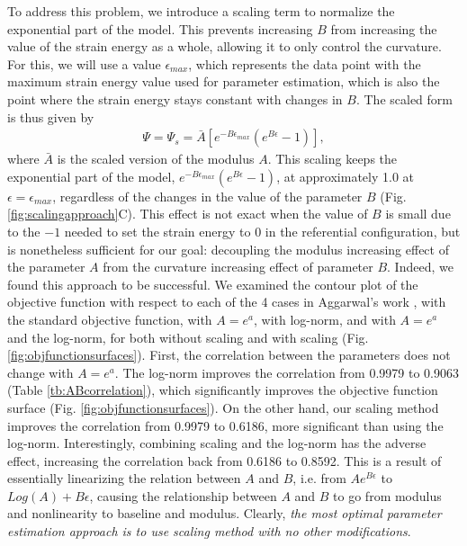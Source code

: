 	To address this problem, we introduce a scaling term to normalize the exponential part of the model. This prevents increasing $B$ from increasing the value of the strain energy as a whole, allowing it to only control the curvature. For this, we will use a value $\epsilon_{max}$, which represents the data point with the maximum strain energy value used for parameter estimation, which is also the point where the strain energy stays constant with changes in $B$. The scaled form is thus given by
\begin{equation}
\begin{aligned}
\Psi = \Psi_s = \bar{A} \left[e^{-B\epsilon_{max}} \left( e^{B\epsilon} - 1\right)\right],\label{eqn:scaledmodel1D}
\end{aligned}
\end{equation}
    where $\bar{A}$ is the scaled version of the modulus $A$. This scaling keeps the exponential part of the model, $e^{-B\epsilon_{max}} ( e^{B\epsilon} - 1)$, at approximately 1.0 at $\epsilon = \epsilon_{max}$, regardless of the changes in the value of the parameter $B$ (Fig. \ref{fig:scalingapproach}C). This effect is not exact when the value of $B$ is small due to the $-1$ needed to set the strain energy to 0 in the referential configuration, but is nonetheless sufficient for our goal: decoupling the modulus increasing effect of the parameter $A$ from the curvature increasing effect of parameter $B$. Indeed, we found this approach to be successful. We examined the contour plot of the objective function with respect to each of the 4 cases in Aggarwal's work \cite{aggarwal_improved_2017}, with the standard objective function, with $A=e^{a}$, with log-norm, and with $A=e^{a}$ and the log-norm, for both without scaling and with scaling (Fig. \ref{fig:objfunctionsurfaces}). First, the correlation between the parameters does not change with $A=e^{a}$. The log-norm improves the correlation from 0.9979 to 0.9063 (Table \ref{tb:ABcorrelation}), which significantly improves the objective function surface (Fig. \ref{fig:objfunctionsurfaces}). On the other hand, our scaling method improves the correlation from 0.9979 to 0.6186, more significant than using the log-norm. Interestingly, combining scaling and the log-norm has the adverse effect, increasing the correlation back from 0.6186 to 0.8592. This is a result of essentially linearizing the relation between $A$ and $B$, i.e. from $Ae^{B\epsilon}$ to $Log(A)+B\epsilon$, causing the relationship between $A$ and $B$ to go from modulus and nonlinearity to baseline and modulus. Clearly, \emph{the most optimal parameter estimation approach is to use scaling method with no other modifications}. 
    
